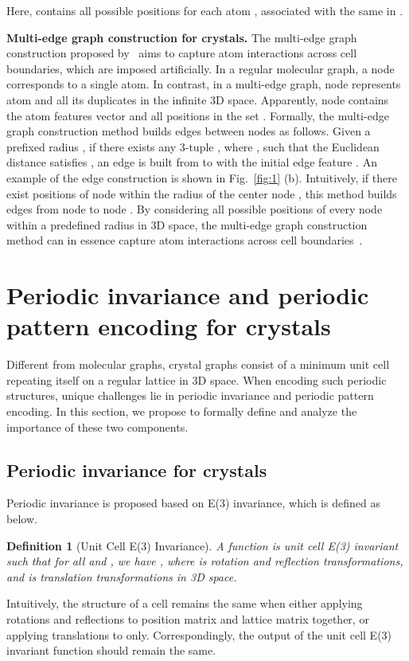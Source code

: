 \documentclass{article}
\newtheorem{definition}{Definition}
\begin{document}
Here,  contains all possible positions for each atom , associated with the same  in .



\textbf{Multi-edge graph construction for crystals.} The multi-edge graph construction proposed by~\citet{cgcnn} aims to capture atom interactions across cell boundaries, which are imposed artificially. In a regular molecular graph, a node corresponds to a single atom. In contrast,
in a multi-edge graph, node  represents 
atom  and all its duplicates in the infinite 3D space.
Apparently, node  contains
the atom features vector  and all positions in the set
    . 
Formally, the multi-edge graph construction method builds edges between nodes as follows.
Given a prefixed radius ,
if there exists any 3-tuple , where , such that the Euclidean distance  satisfies
,
an edge is built from  to  with the initial edge feature . An example of the edge construction is shown in Fig.~\ref{fig:1} (b). Intuitively, if there exist  positions of node  within the radius of the center node , this method builds  edges from node  to node .
By considering all possible positions of every node within a predefined radius in 3D space,
the multi-edge graph construction method can in essence capture atom interactions across cell boundaries~\citep{cyatt, gatgnn, megnet, schnet,alignn}.




\section{Periodic invariance and periodic pattern encoding for crystals}
\label{sec:3}

Different from molecular graphs, crystal graphs consist of a minimum unit cell repeating itself on a regular lattice in 3D space. When encoding such periodic structures, unique challenges lie in periodic invariance and periodic pattern encoding. In this section, we propose to formally define and analyze the importance of these two components.

\subsection{Periodic invariance for crystals}
\label{sec:p_invariance}



Periodic invariance is proposed based on E(3) invariance,  which is defined as below.



\begin{definition}[Unit Cell E(3) Invariance]
A function  is unit cell E(3) invariant such that for all  and  , we have , where  is rotation and reflection transformations, and  is translation transformations in 3D space.
\end{definition}
Intuitively, 
the structure of a cell remains the same when either applying rotations and reflections to position matrix  and lattice matrix  together, or applying translations to  only. Correspondingly, the output of the unit cell E(3) invariant function should remain the same. 
\end{document}
